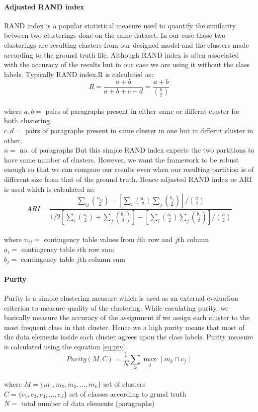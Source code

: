\paragraph{Adjusted RAND index}
RAND index is a popular statistical measure used to quantify the similarity between two clusterings done on the same dataset. In our case those two clusterings are resulting clusters from our designed model and the clusters made according to the ground truth file. Although RAND index is often associated with the accuracy of the results but in our case we are using it without the class labels. Typically RAND index,R is calculated as:
\begin{equation}
R = \frac{a+b}{a+b+c+d} = \frac{a+b}{{{n}\choose{2}}} 
\end{equation}
\\where $a,b = $ pairs of paragraphs present in either same or differnt cluster for both clustering,
\\$c,d = $ pairs of paragraphs present in same cluster in one but in differnt cluster in other,
\\$n = $ no. of paragraphs
But this simple RAND index expects the two partitions to have same number of clusters. However, we want the framework to be robust enough so that we can compare our results even when our resulting partition is of different size from that of the ground truth. Hence adjusted RAND index or ARI is used which is calculated as:
\begin{equation}
ARI = \frac{\sum_{ij}{{n_{ij}}\choose{2}}-[\sum_{i}{a_{i}\choose{2}}\sum_{j}{b_{j}\choose{2}}]/{{n}\choose{2}}}{1/2[\sum_{i}{a_{i}\choose{2}}+\sum_{j}{b_{j}\choose{2}}]-[\sum_{i}{a_{i}\choose{2}}\sum_{j}{b_{j}\choose{2}}]/{{n}\choose{2}}}
\end{equation}
\\where $n_{ij}=$ contingency table values from $i$th row and $j$th column
\\$a_{i}=$ contingency table $i$th row sum
\\$b_{j}=$ contingency table $j$th column sum
\paragraph{Purity}
Purity is a simple clustering measure which is used as an external evaluation criterion to measure quality of the clustering. While caculating purity, we basically measure the accuracy of the assignment if we assign each cluster to the most frequent class in that cluster. Hence we a high purity means that most of the data elements inside each cluster agrees upon the class labels. Purity measure is calculated using the equation \ref{eq:pty}.
\begin{equation}
\label{eq:pty}
Purity(M,C) = \frac{1}{N} \sum_{k} \max_{j} \mid m_k \cap c_j \mid
\end{equation}
\\where $M = \{m_1, m_2, m_3, ... , m_k\}$ set of clusters
\\$C = \{c_1, c_2, c_3, ... , c_J\}$ set of classes according to grund truth
\\$N =$ total number of data elements (paragraphs)

